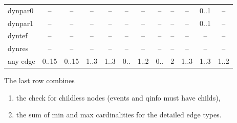 \begin{table}
\begin{adjustwidth}{-25mm}{}
\begin{tabular}[t]{|l|c|c|c|c|c|c|c|c|c|c|c|}
dynpar0          & --    & --         & --   & --    & --      & --   & --   & --    & --     & 0..1 & --   \\
dynpar1          & --    & --         & --   & --    & --      & --   & --   & --    & --     & 0..1 & --   \\
dyntef           & --    & --         & --   & --    & --      & --   & --   & --    & --     & --   & --   \\
dynres           & --    & --         & --   & --    & --      & --   & --   & --    & --     & --   & --   \\
any edge         & 0..15 & 0..15      & 1..3 & 1..3  & 0..     & 1..2 & 0..  & 2     & 1..3   & 1..3 & 1..2 \\
\hline
\end{tabular}
\end{adjustwidth}
\end{table}
The last row combines
\begin{enumerate}
\item the check for childless nodes (events and qinfo must have childs),
\item the sum of min and max cardinalities for the detailed edge types.
\end{enumerate}

